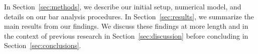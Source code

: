 \documentclass[twocolumn,linenumbers]{aastex631}
\newcommand{\RCR}{\ensuremath{R_{\textrm{CR}}}}
\newcommand{\Rot}{\ensuremath{\mathcal{R}}}
\begin{document}
In Section~\ref{sec:methods}, we describe our initial setup, numerical model,
and details on our bar analysis procedures. In Section~\ref{sec:results}, we
summarize the main results from our findings. We discuss these findings at more
length and in the context of previous research in Section~\ref{sec:discussion}
before concluding in Section~\ref{sec:conclusions}.


\end{document}

